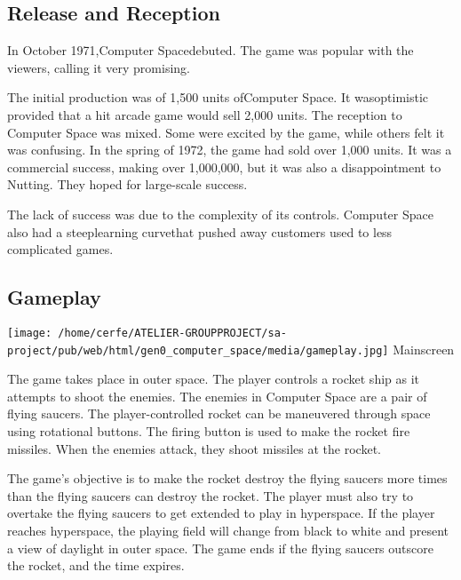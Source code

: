 \documentclass[a4paper,10pt]{book}
\begin{document}
 
 \subsection{Release and Reception }
 
            In October 1971,Computer Spacedebuted. The game was popular with the viewers, calling it very promising.
           
 
            The initial production was of 1,500 units ofComputer Space. It wasoptimistic provided that a hit arcade game would sell 2,000 units. 
            The reception to Computer Space was mixed. Some were excited by the game, while others felt it was confusing. 
            In the spring of 1972, the game had sold over 1,000 units. It was a commercial success, making over 1,000,000, but it was also a disappointment to Nutting. They hoped for large-scale success.
           
 
            The lack of success was due to the complexity of its controls. Computer Space also had a steeplearning curvethat pushed away customers used to less complicated games.
           
 
 \subsection{Gameplay }
 
 \texttt{[image: /home/cerfe/ATELIER-GROUPPROJECT/sa-project/pub/web/html/gen0\_computer\_space/media/gameplay.jpg]}
 Mainscreen 
 
 
            The game takes place in outer space. The player controls a rocket ship as it attempts to shoot the enemies. The enemies in Computer Space are a pair of flying saucers. 
            The player-controlled rocket can be maneuvered through space using rotational buttons. The firing button is used to make the rocket fire missiles. When the enemies attack, they shoot missiles at the rocket.
           
 
            The game's objective is to make the rocket destroy the flying saucers more times than the flying saucers can destroy the rocket. 
            The player must also try to overtake the flying saucers to get extended to play in hyperspace. If the player reaches hyperspace, the playing field will change from black to white and present a view of daylight in outer space. 
            The game ends if the flying saucers outscore the rocket, and the time expires.
           
 
 
\end{document}
